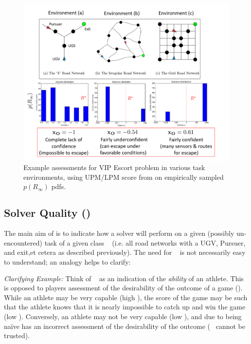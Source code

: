 \begin{figure}[tbp]
    \centering
    \includegraphics[width=0.99\linewidth]{Figures/xO_envsOnly.png}
    \caption{Example \xO{} assessments for VIP Escort problem in various task environments, using UPM/LPM score from \cite{Aitken2016-cv} on empirically sampled $p(R_{\infty})$ pdfs.}
    \label{fig:xOexample}
\end{figure}


\subsection{Solver Quality (\xQ)} \label{sec:SQ}
    The main aim of \xQ{} is to indicate how a solver \solve{} will perform on a given (possibly un-encountered) task \task{} of a given class \taskclass~ (i.e. all road networks with a UGV, Pursuer, and exit,et cetera as described previously). The need for \xQ~ is not necessarily easy to understand; an analogy helps to clarify:
    
    \emph{Clarifying Example:} Think of \xQ~ as an indication of the \emph{ability} of an athlete. This is opposed to players assessment of the desirability of the outcome of a game (\xO). While an athlete may be very capable (high \xQ), the score of the game may be such that the athlete knows that it is nearly impossible to catch up and win the game (low \xO). Conversely, an athlete may not be very capable (low \xQ), and due to being na\"{i}ve has an incorrect assessment of the desirability of the outcome (\xO~ cannot be trusted).
    
